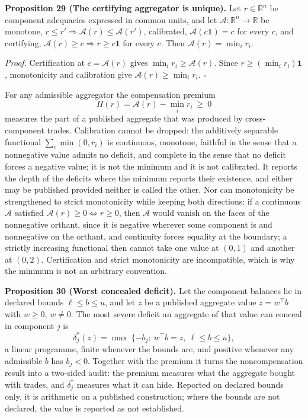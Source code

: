 \documentclass[11pt]{article}
\begin{document}
\textbf{Proposition 29 (The certifying aggregator is unique).} Let \(r\in\mathbb R^{n}\) be component
adequacies expressed in common units, and let \(\mathcal A:\mathbb R^{n}\to\mathbb R\) be monotone,
\(r\le r'\Rightarrow\mathcal A(r)\le\mathcal A(r')\), calibrated, \(\mathcal A(c\mathbf 1)=c\) for
every \(c\), and certifying, \(\mathcal A(r)\ge c\Rightarrow r\ge c\mathbf 1\) for every \(c\). Then
\(\mathcal A(r)=\min_ir_i\).

\emph{Proof.} Certification at \(c=\mathcal A(r)\) gives \(\min_ir_i\ge\mathcal A(r)\). Since
\(r\ge(\min_ir_i)\mathbf 1\), monotonicity and calibration give \(\mathcal A(r)\ge\min_ir_i\).
\ensuremath{\square}

For any admissible aggregator the compensation premium
\[ \Pi(r)=\mathcal A(r)-\min_ir_i\ \ge\ 0 \]
measures the part of a published aggregate that was produced by cross-component trades. Calibration
cannot be dropped: the additively separable functional \(\sum_i\min(0,r_i)\) is continuous, monotone,
faithful in the sense that a nonnegative value admits no deficit, and complete in the sense that no
deficit forces a negative value; it is not the minimum and it is not calibrated. It reports the depth
of the deficits where the minimum reports their existence, and either may be published provided
neither is called the other. Nor can monotonicity be strengthened to strict monotonicity while
keeping both directions: if a continuous \(\mathcal A\) satisfied \(\mathcal A(r)\ge0\Leftrightarrow r\ge0\), then \(\mathcal A\) would vanish on the faces of the nonnegative orthant, since it is
negative wherever some component is and nonnegative on the orthant, and continuity forces equality
at the boundary; a strictly increasing functional then cannot take one value at \((0,1)\) and another
at \((0,2)\). Certification and strict monotonicity are incompatible, which is why the minimum is not
an arbitrary convention.

\textbf{Proposition 30 (Worst concealed deficit).} Let the component balances lie in declared bounds
\(\ell\le b\le u\), and let \(z\) be a published aggregate value \(z=w^{\top}b\) with \(w\ge0\),
\(w\ne0\). The most severe deficit an aggregate of that value can conceal in component \(j\) is
\[ \delta^{*}_j(z)=\max\ \{-b_j:\ w^{\top}b=z,\ \ell\le b\le u\}, \]
a linear programme, finite whenever the bounds are, and positive whenever any admissible \(b\) has
\(b_j<0\). Together with the premium it turns the noncompensation result into a two-sided audit: the
premium measures what the aggregate bought with trades, and \(\delta^{*}_j\) measures what it can
hide. Reported on declared bounds only, it is arithmetic on a published construction; where the
bounds are not declared, the value is reported as not established.
\end{document}
